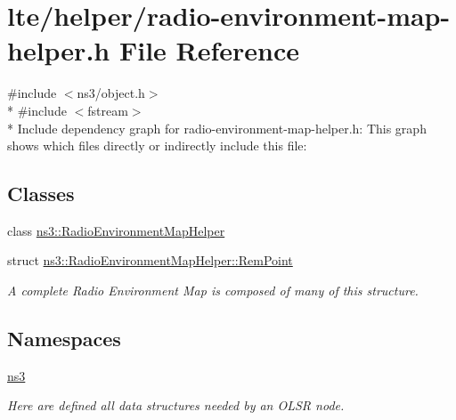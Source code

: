 \hypertarget{radio-environment-map-helper_8h}{}\section{lte/helper/radio-\/environment-\/map-\/helper.h File Reference}
\label{radio-environment-map-helper_8h}
{\ttfamily \#include $<$ns3/object.\+h$>$}\\*
{\ttfamily \#include $<$fstream$>$}\\*
Include dependency graph for radio-\/environment-\/map-\/helper.h\+:
This graph shows which files directly or indirectly include this file\+:
\subsection*{Classes}
\begin{DoxyCompactItemize}
\item 
class \hyperlink{classns3_1_1RadioEnvironmentMapHelper}{ns3\+::\+Radio\+Environment\+Map\+Helper}
\item 
struct \hyperlink{structns3_1_1RadioEnvironmentMapHelper_1_1RemPoint}{ns3\+::\+Radio\+Environment\+Map\+Helper\+::\+Rem\+Point}
\begin{DoxyCompactList}\small\item\em A complete Radio Environment Map is composed of many of this structure. \end{DoxyCompactList}\end{DoxyCompactItemize}
\subsection*{Namespaces}
\begin{DoxyCompactItemize}
\item 
 \hyperlink{namespacens3}{ns3}
\begin{DoxyCompactList}\small\item\em Here are defined all data structures needed by an O\+L\+SR node. \end{DoxyCompactList}\end{DoxyCompactItemize}
